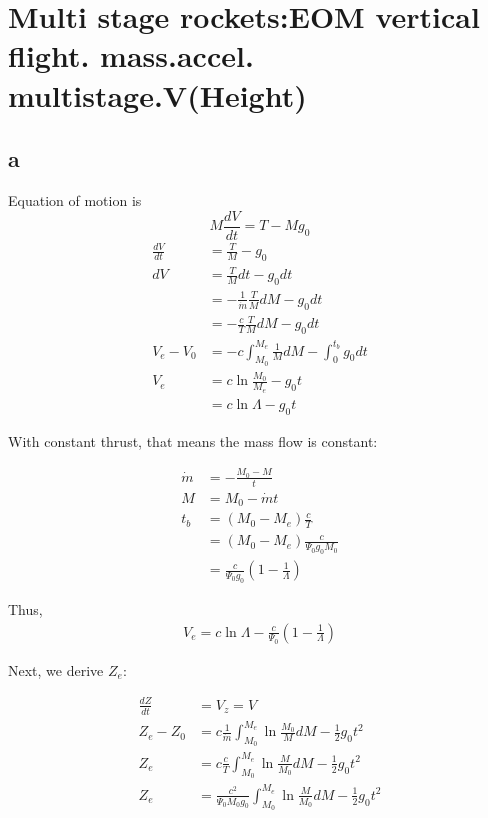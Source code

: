 \section{ Multi stage rockets:EOM vertical flight. mass.accel. multistage.V(Height) }\label{sec:q2}    
\subsection*{a}
Equation of motion is
\begin{equation}
    M \frac{dV}{dt} = T - Mg_0
\end{equation}
\begin{equation}
\begin{split}
    \frac{dV}{dt} &= \frac{T}{M} - g_0 \\
    dV &= \frac{T}{M} dt - g_0 dt \\
    &= -\frac{1}{\dot{m}}\frac{T}{M} dM - g_0 dt \\
    &= -\frac{c}{T}\frac{T}{M} dM - g_0 dt \\
    V_e - V_0 &= -c \int_{M_0}^{M_e} \frac{1}{M} dM - \int_{0}^{t_b} g_0 dt \\
    V_e &= c \ln{\frac{M_0}{M_e}} - g_0 t \\
    &= c \ln{\Lambda} - g_0 t
\end{split}
\end{equation}

With constant thrust, that means the mass flow is constant:

\begin{equation}
    \begin{split}
        \dot{m} &= -\frac{M_0 - M}{t} \\
        M &= M_0 - \dot{m} t \\
        t_b &= (M_0 - M_e) \frac{c}{T} \\
        &= (M_0 - M_e) \frac{c}{\Psi_0 g_0 M_0} \\
        &= \frac{c}{\Psi_0 g_0} (1 - \frac{1}{\Lambda})
    \end{split}
\end{equation}

Thus, 
\begin{equation}
    \begin{split}
        V_e = c \ln{\Lambda} - \frac{c}{\Psi_0} (1 - \frac{1}{\Lambda})
    \end{split}
\end{equation}

Next, we derive $Z_e$:

\begin{equation}
\begin{split}
    \frac{dZ}{dt} &= V_z = V \\
    Z_e - Z_0 &= c\frac{1}{\dot{m}} \int_{M_0}^{M_e} \ln{\frac{M_0}{M}} dM - \frac{1}{2}g_0 t^2 \\
    Z_e  &= c \frac{c}{T} \int_{M_0}^{M_e} \ln{\frac{M}{M_0}} dM - \frac{1}{2}g_0 t^2 \\
    Z_e  &=  \frac{c^2}{\Psi_0 M_0 g_0} \int_{M_0}^{M_e} \ln{\frac{M}{M_0}} dM - \frac{1}{2}g_0 t^2 \\
\end{split}
\end{equation}

